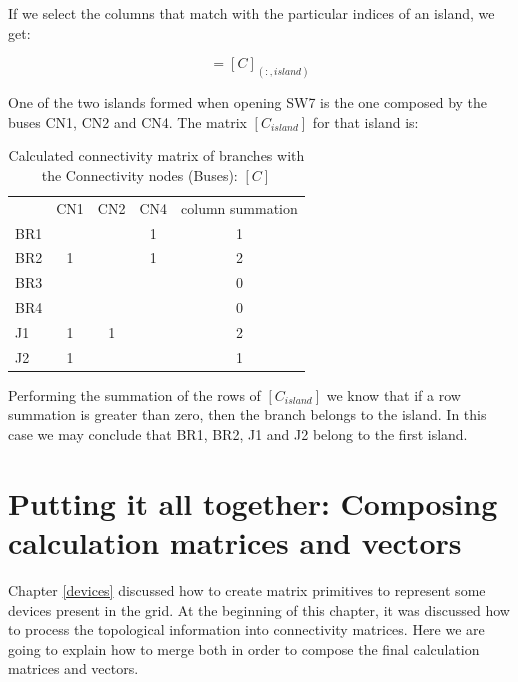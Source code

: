 \documentclass[nols,a4paper,twoside,notoc,fleqn]{tufte-book}
\begin{document}
\vspace{0.5cm}

If we select the columns that match with the particular indices of an island, we get:

\begin{equation}
[C_{island}] = [C]_{(:, island)}
\end{equation}

One of the two islands formed when opening SW7 is the one composed by the buses CN1, CN2 and CN4. The matrix $[C_{island}]$ for that island is:

\begin{table}[h!]
	\begin{tabular}{lccc|c}
		{} &  CN1 &  CN2 &  CN4 & column summation\\
		BR1 &      &      &     1    &  1\\
		BR2 &    1 &      &      1   &  2 \\
		BR3 &      &      &          &  0\\
		BR4 &      &      &          &  0\\
		J1  &    1 &    1 &          &  2\\
		J2  &    1 &      &          &  1\\
	\end{tabular}
	\caption{Calculated connectivity matrix of branches with the Connectivity nodes (Buses): $[C]$}
\end{table}
\vspace{0.5cm}

Performing the summation of the rows of $[C_{island}]$ we know that if a row summation is greater than zero, then the branch belongs to the island. In this case we may conclude that BR1, BR2, J1 and J2 belong to the first island.


\section{Putting it all together: Composing calculation matrices and vectors}

Chapter \ref{devices} discussed how to create matrix primitives to represent some devices present in the grid. At the beginning of this chapter, it was discussed how to process the topological information into connectivity matrices. Here we are going to explain how to merge both in order to compose the final calculation matrices and vectors.
\end{document}
